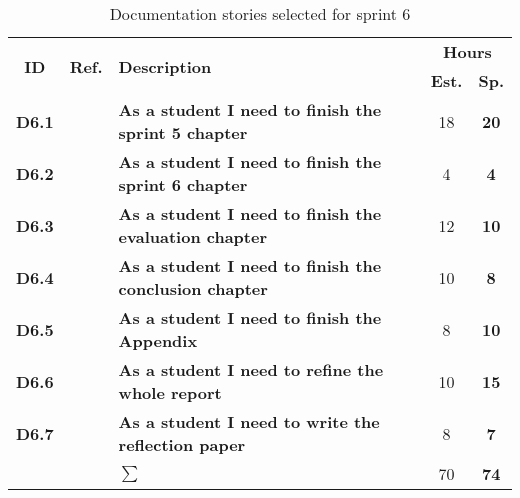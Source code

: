 \begin{table*}[!ht]%
 \def\arraystretch{1.25}
 
 \caption{Documentation stories selected for sprint 6}
   \label{tab:sprint6Documentationstories}

\begin{tabularx}{\textwidth}{ccXcc} 

\toprule[0.5mm]
\multirow{2}{*}{\textbf{ID}} &
\multirow{2}{*}{\textbf{Ref.}} & \multirow{2}{*}{\textbf{Description}} & \multicolumn{2}{c}{\textbf{Hours}} \\
 					& & & \textbf{Est.} & \textbf{Sp.} \\
\midrule

\textbf{D6.1} 	& & {\bf As a student I need to finish the sprint 5 chapter} 		& 18  & \textbf{20} \\
	
\textbf{D6.2} 	& & {\bf As a student I need to finish the sprint 6 chapter} 		& 4	& \textbf{4} \\

\textbf{D6.3} 	& & {\bf As a student I need to finish the evaluation chapter} 		& 12	& \textbf{10} \\

\textbf{D6.4} 	&& {\bf As a student I need to finish the conclusion chapter} 		& 10	& \textbf{8} \\

\textbf{D6.5} 	&& {\bf As a student I need to finish the Appendix} 				& 8	& \textbf{10} \\

\textbf{D6.6} 	&& {\bf As a student I need to refine the whole report} 			& 10	& \textbf{15} \\
\textbf{D6.7} 	&& {\bf As a student I need to write the reflection paper} 			& 8	& \textbf{7} \\
\midrule
		
				&& \textbf{$\sum$}		&	70	& \textbf{74}
 \\																			
\bottomrule[0.5mm]
\end{tabularx}
\end{table*}
